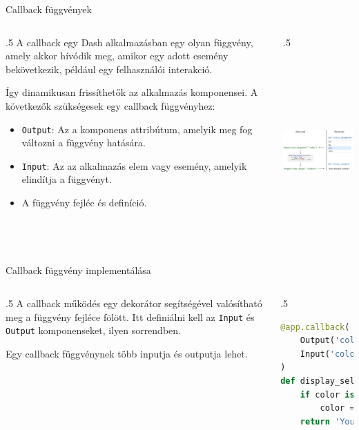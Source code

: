 \documentclass[english, aspectratio=169]{beamer}
\begin{document}
\begin{frame}{Callback függvények}
	\begin{columns}
		\begin{column}{.5\textwidth}
			A callback egy Dash alkalmazásban egy olyan függvény, amely akkor hívódik meg, amikor egy adott esemény bekövetkezik, például egy felhasználói interakció.\par\smallskip
			Így dinamikusan frissíthetők az alkalmazás komponensei. A következők szükségesek egy callback függvényhez:
			\begin{itemize}
				\item \texttt{Output}: Az a komponens attribútum, amelyik meg fog változni a függvény hatására. 
				\item \texttt{Input}: Az az alkalmazás elem vagy esemény, amelyik elindítja a függvényt.
				\item A függvény fejléc és definíció. 
			\end{itemize}
		\end{column}
		\begin{column}{.5\textwidth}
			\begin{center}
				\includegraphics[width=7cm, height=7cm, keepaspectratio]{images/dash_13.png}
			\end{center}
		\end{column}
	\end{columns}
\end{frame}

\begin{frame}[fragile]{Callback függvény implementálása}
	\begin{columns}
		\begin{column}{.5\textwidth}
			A callback működés egy dekorátor segítségével valósítható meg a függvény fejléce fölött. Itt definiálni kell az \texttt{Input} és \texttt{Output} komponenseket, ilyen sorrendben.\par\smallskip
			Egy callback függvénynek több inputja és outputja lehet.
		\end{column}
		\begin{column}{.5\textwidth}
			\begin{lstlisting}[language=python]
@app.callback(
	Output('color_output', 'children'),
	Input('color_dropdown', 'value')
)
def display_selected_color(color):
	if color is None:
		color = 'nothing'
	return 'You selected ' + color
			\end{lstlisting}
		\end{column}
	\end{columns}
\end{frame}
\end{document}
